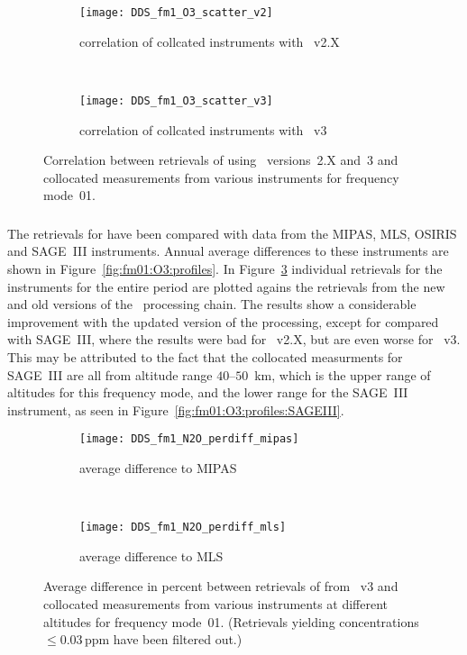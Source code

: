 \begin{figure}[htpb]
    \centering
    \begin{subfigure}[b]{0.49\textwidth}
        \texttt{[image: DDS\_fm1\_O3\_scatter\_v2]}
        \caption{correlation of collcated instruments with \smr~v2.X}
        \label{fig:fm01:O3:scatter:v2}
    \end{subfigure}
    \,
    \begin{subfigure}[b]{0.49\textwidth}
        \texttt{[image: DDS\_fm1\_O3\_scatter\_v3]}
        \caption{correlation of collcated instruments with \smr~v3}
        \label{fig:fm01:O3:scatter:v3}
    \end{subfigure}
    \caption{Correlation between retrievals of  using \smr\
    versions~2.X and~3 and collocated measurements from various instruments
    for frequency mode~01.}
    \label{fig:fm01:O3:scatter}
\end{figure}

\subsubsection{}
\label{sec:fm01:comparison:O3}
The retrievals for \chem{O_3} have been compared with data from the MIPAS, MLS,
OSIRIS and SAGE~III instruments. Annual average differences to these
instruments are shown in Figure~\ref{fig:fm01:O3:profiles}. In
Figure~\ref{fig:fm01:O3:scatter} individual retrievals for the instruments for
the entire period are plotted agains the retrievals from the new and old
versions of the \smr\ processing chain. The results show a considerable
improvement with the updated version of the processing, except for compared
with SAGE~III, where the results were bad for \smr~v2.X, but are even worse for
\smr~v3. This may be attributed to the fact that the collocated measurments for
SAGE~III are all from altitude range $40$--$50$~km, which is the upper range of
altitudes for this frequency mode, and the lower range for the SAGE~III
instrument, as seen in Figure~\ref{fig:fm01:O3:profiles:SAGEIII}.



\begin{figure}[htpb]
    \centering
    \begin{subfigure}[b]{0.49\textwidth}
        \texttt{[image: DDS\_fm1\_N2O\_perdiff\_mipas]}
        \caption{average difference to MIPAS}
        \label{fig:fm01:N2O:profiles:MIPAS}
    \end{subfigure}
    \,
    \begin{subfigure}[b]{0.49\textwidth}
        \texttt{[image: DDS\_fm1\_N2O\_perdiff\_mls]}
        \caption{average difference to MLS}
        \label{fig:fm01:N2O:profiles:MLS}
    \end{subfigure}
    \caption{Average difference in percent between retrievals of 
    from \smr~v3 and collocated measurements from various instruments at
    different altitudes for frequency mode~01. (Retrievals yielding
    concentrations $\leq 0.03\,\mathrm{ppm}$ have been filtered out.)}
    \label{fig:fm01:N2O:profiles}
\end{figure}

